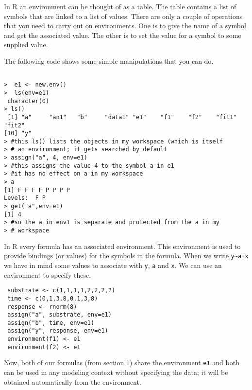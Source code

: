 \documentclass{article}
\begin{document}
In R an environment can be thought of as a table. The table contains a
list of symbols that are linked to a list of values.
There are only a couple of operations that you need to carry out on
environments. One is to give the name of a symbol and get the
associated value. The other is to set the value for a symbol to some
supplied value.

The following code shows some simple manipulations that you can do.

\begin{verbatim}

>  e1 <- new.env()
>  ls(env=e1)
 character(0)
> ls()
 [1] "a"     "an1"   "b"     "data1" "e1"    "f1"    "f2"    "fit1"  "fit2" 
[10] "y" 
> #this ls() lists the objects in my workspace (which is itself
> # an environment; it gets searched by default
> assign("a", 4, env=e1)
> #this assigns the value 4 to the symbol a in e1
> #it has no effect on a in my workspace
> a
[1] F F F F P P P P
Levels:  F P 
> get("a",env=e1)
[1] 4
> #so the a in env1 is separate and protected from the a in my
> # workspace
\end{verbatim}

In R every formula has an associated environment. This environment is
used to provide bindings (or values) for the symbols in the
formula. When we write \verb=y~a+x= we have in mind some values to
associate with \verb+y+, \verb+a+ and \verb+x+. We can use an
environment to specify these.

\begin{verbatim}
 substrate <- c(1,1,1,1,2,2,2,2)
 time <- c(0,1,3,8,0,1,3,8)
 response <- rnorm(8)
 assign("a", substrate, env=e1)
 assign("b", time, env=e1)
 assign("y", response, env=e1)
 environment(f1) <- e1
 environment(f2) <- e1
\end{verbatim}
Now, both of our formulas (from section 1) share the environment
\verb+e1+ and both can be used in any modeling context without
specifying the data; it will be obtained automatically from the
environment. 
\end{document}
